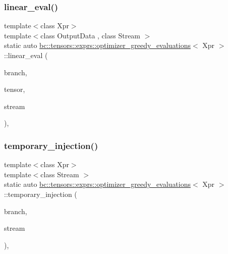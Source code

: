 \subsubsection{\texorpdfstring{linear\+\_\+eval()}{linear\_eval()}}
{\footnotesize\ttfamily template$<$class Xpr$>$ \\
template$<$class Output\+Data , class Stream $>$ \\
static auto \hyperlink{structbc_1_1tensors_1_1exprs_1_1optimizer__greedy__evaluations}{bc\+::tensors\+::exprs\+::optimizer\+\_\+greedy\+\_\+evaluations}$<$ Xpr $>$\+::linear\+\_\+eval (\begin{DoxyParamCaption}\item[{Xpr}]{branch,  }\item[{Output\+Data}]{tensor,  }\item[{\hyperlink{classbc_1_1streams_1_1Stream}{Stream}}]{stream }\end{DoxyParamCaption})\hspace{0.3cm}{\ttfamily [inline]}, {\ttfamily [static]}}

\mbox{\label{structbc_1_1tensors_1_1exprs_1_1optimizer__greedy__evaluations_a1ebd1740233b1fd7aef179c9334d8919}} 
\subsubsection{\texorpdfstring{temporary\+\_\+injection()}{temporary\_injection()}}
{\footnotesize\ttfamily template$<$class Xpr$>$ \\
template$<$class Stream $>$ \\
static auto \hyperlink{structbc_1_1tensors_1_1exprs_1_1optimizer__greedy__evaluations}{bc\+::tensors\+::exprs\+::optimizer\+\_\+greedy\+\_\+evaluations}$<$ Xpr $>$\+::temporary\+\_\+injection (\begin{DoxyParamCaption}\item[{Xpr}]{branch,  }\item[{\hyperlink{classbc_1_1streams_1_1Stream}{Stream}}]{stream }\end{DoxyParamCaption})\hspace{0.3cm}{\ttfamily [inline]}, {\ttfamily [static]}}



